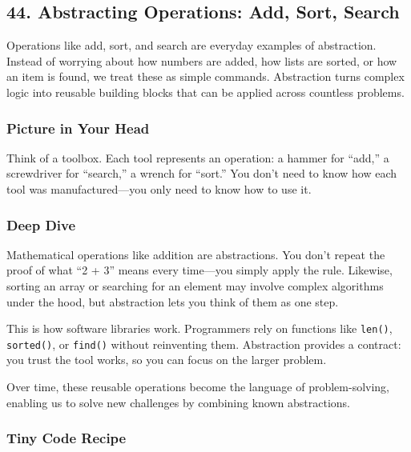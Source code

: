 \documentclass[
  letterpaper,
  DIV=11,
  numbers=noendperiod]{scrreprt}
\begin{document}
\subsection{44. Abstracting Operations: Add, Sort,
Search}\label{abstracting-operations-add-sort-search}

Operations like add, sort, and search are everyday examples of
abstraction. Instead of worrying about how numbers are added, how lists
are sorted, or how an item is found, we treat these as simple commands.
Abstraction turns complex logic into reusable building blocks that can
be applied across countless problems.

\subsubsection{Picture in Your Head}\label{picture-in-your-head-43}

Think of a toolbox. Each tool represents an operation: a hammer for
``add,'' a screwdriver for ``search,'' a wrench for ``sort.'' You don't
need to know how each tool was manufactured---you only need to know how
to use it.

\subsubsection{Deep Dive}\label{deep-dive-13}

Mathematical operations like addition are abstractions. You don't repeat
the proof of what ``2 + 3'' means every time---you simply apply the
rule. Likewise, sorting an array or searching for an element may involve
complex algorithms under the hood, but abstraction lets you think of
them as one step.

This is how software libraries work. Programmers rely on functions like
\texttt{len()}, \texttt{sorted()}, or \texttt{find()} without
reinventing them. Abstraction provides a contract: you trust the tool
works, so you can focus on the larger problem.

Over time, these reusable operations become the language of
problem-solving, enabling us to solve new challenges by combining known
abstractions.

\subsubsection{Tiny Code Recipe}\label{tiny-code-recipe-41}
\end{document}
